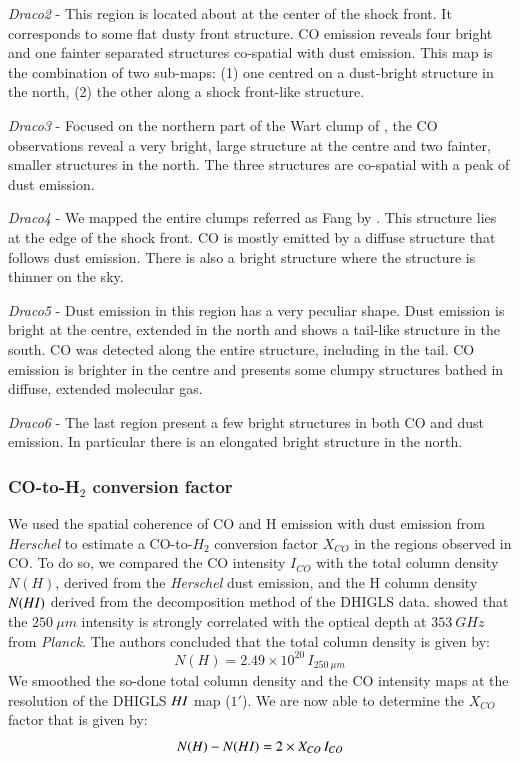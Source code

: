 \documentclass[traditabstract]{aa}
\begin{document}
\noindent \textit{Draco2} - This region is located about at the center of the shock front. It corresponds to some flat dusty front structure. CO emission reveals four bright and one fainter separated structures co-spatial with dust emission. This map is the combination of two sub-maps: (1) one centred on a dust-bright structure in the north, (2) the other along a shock front-like structure.
\medskip

\noindent \textit{Draco3} - Focused on the northern part of the Wart clump of \cite{Mebold_1985}, the CO observations reveal a very bright, large structure at the centre and two fainter, smaller structures in the north. The three structures are co-spatial with a peak of dust emission.
\medskip

\noindent \textit{Draco4} - We mapped the entire clumps referred as Fang by \cite{Mebold_1985}. This structure lies at the edge of the shock front. CO is mostly emitted by a diffuse structure that follows dust emission. There is also a bright structure where the structure is thinner on the sky.
\medskip

\noindent \textit{Draco5} - Dust emission in this region has a very peculiar shape. Dust emission is bright at the centre, extended in the north and shows a tail-like structure in the south. CO was detected along the entire structure, including in the tail. CO emission is brighter in the centre and presents some clumpy structures bathed in diffuse, extended molecular gas.
\medskip

\noindent \textit{Draco6} - The last region present a few bright structures in both CO and dust emission. In particular there is an elongated bright structure in the north.


      \subsubsection{CO-to-H$_2$ conversion factor}

   We used the spatial coherence of CO and H emission with dust emission from \emph{Herschel} to estimate a CO-to-$H_2$ conversion factor $X_{CO}$ in the regions observed in CO. To do so, we compared the CO intensity $I_{CO}$ with the total column density $N(H)$, derived from the \emph{Herschel} dust emission, and the H column density $N(H\rmnum{1})$ derived from the decomposition method of the DHIGLS data. \cite{MAMD_2017b} showed that the $250\: \mu m$ intensity is strongly correlated with the optical depth at $353\: GHz$ from \emph{Planck}. The authors concluded that the total column density is given by:
\begin{equation}
  N(H)=2.49\times 10^{20}\, I_{250\: \mu m}
\end{equation}
We smoothed the so-done total column density and the CO intensity maps at the resolution of the DHIGLS $H\rmnum{1}$ map ($1'$). We are now able to determine the $X_{CO}$ factor that is given by:
\begin{equation}
  N(H)-N(H\rmnum{1})=2\times X_{CO}\, I_{CO}
\end{equation}
\end{document}
